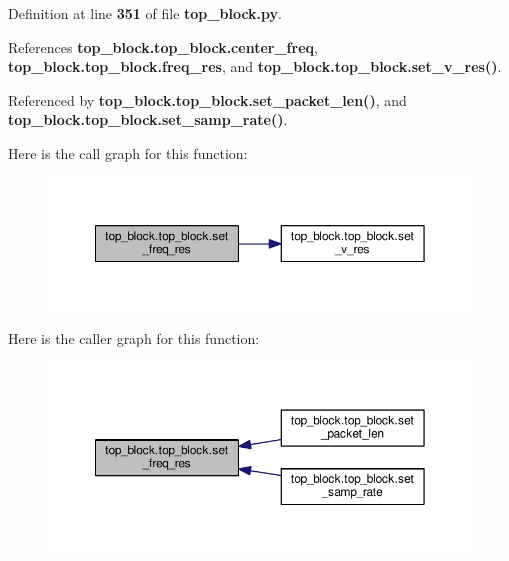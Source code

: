 Definition at line {\bf 351} of file {\bf top\+\_\+block.\+py}.



References {\bf top\+\_\+block.\+top\+\_\+block.\+center\+\_\+freq}, {\bf top\+\_\+block.\+top\+\_\+block.\+freq\+\_\+res}, and {\bf top\+\_\+block.\+top\+\_\+block.\+set\+\_\+v\+\_\+res()}.



Referenced by {\bf top\+\_\+block.\+top\+\_\+block.\+set\+\_\+packet\+\_\+len()}, and {\bf top\+\_\+block.\+top\+\_\+block.\+set\+\_\+samp\+\_\+rate()}.



Here is the call graph for this function\+:
\nopagebreak
\begin{figure}[H]
\begin{center}
\leavevmode
\includegraphics[width=350pt]{d7/db3/classtop__block_1_1top__block_a9d5f2a6de4b6adb4a0472bff0454b04a_cgraph}
\end{center}
\end{figure}




Here is the caller graph for this function\+:
\nopagebreak
\begin{figure}[H]
\begin{center}
\leavevmode
\includegraphics[width=350pt]{d7/db3/classtop__block_1_1top__block_a9d5f2a6de4b6adb4a0472bff0454b04a_icgraph}
\end{center}
\end{figure}


